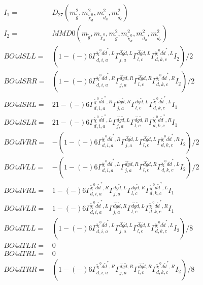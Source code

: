 \documentclass[A4,landscape]{article}
\begin{document}
\begin{align} 
I_1 = & D_{27}(m^2_{\tilde{g}}, m^2_{\tilde{\chi}^0_{{d}}}, m^2_{\tilde{d}_{{a}}}, m^2_{\tilde{d}_{{c}}}) \\ 
I_2 = & MMD0(m_{\tilde{g}}, m_{\tilde{\chi}^0_{{d}}}, m^2_{\tilde{g}}, m^2_{\tilde{\chi}^0_{{d}}}, m^2_{\tilde{d}_{{a}}}, m^2_{\tilde{d}_{{c}}}) \\ 
  BO4dSLL= & (  1
-(-)
  6 \Gamma^{\tilde{\chi}^0 d \tilde{d}^*,L}_{d, i, a} \Gamma^{\bar{d}\tilde{g} \tilde{d} ,L}_{j, a} \Gamma^{\bar{d}\tilde{g} \tilde{d} ,L}_{l, c} \Gamma^{\tilde{\chi}^0 d \tilde{d}^*,L}_{d, k, c} I_2)/2 \\ 
  BO4dSRR= & (  1
-(-)
  6 \Gamma^{\tilde{\chi}^0 d \tilde{d}^*,R}_{d, i, a} \Gamma^{\bar{d}\tilde{g} \tilde{d} ,R}_{j, a} \Gamma^{\bar{d}\tilde{g} \tilde{d} ,R}_{l, c} \Gamma^{\tilde{\chi}^0 d \tilde{d}^*,R}_{d, k, c} I_2)/2 \\ 
  BO4dSRL= & 2   1
-(-)
  6 \Gamma^{\tilde{\chi}^0 d \tilde{d}^*,R}_{d, i, a} \Gamma^{\bar{d}\tilde{g} \tilde{d} ,R}_{j, a} \Gamma^{\bar{d}\tilde{g} \tilde{d} ,L}_{l, c} \Gamma^{\tilde{\chi}^0 d \tilde{d}^*,L}_{d, k, c} I_1 \\ 
  BO4dSLR= & 2   1
-(-)
  6 \Gamma^{\tilde{\chi}^0 d \tilde{d}^*,L}_{d, i, a} \Gamma^{\bar{d}\tilde{g} \tilde{d} ,L}_{j, a} \Gamma^{\bar{d}\tilde{g} \tilde{d} ,R}_{l, c} \Gamma^{\tilde{\chi}^0 d \tilde{d}^*,R}_{d, k, c} I_1 \\ 
  BO4dVRR= & -(  1
-(-)
  6 \Gamma^{\tilde{\chi}^0 d \tilde{d}^*,R}_{d, i, a} \Gamma^{\bar{d}\tilde{g} \tilde{d} ,L}_{j, a} \Gamma^{\bar{d}\tilde{g} \tilde{d} ,L}_{l, c} \Gamma^{\tilde{\chi}^0 d \tilde{d}^*,R}_{d, k, c} I_2)/2 \\ 
  BO4dVLL= & -(  1
-(-)
  6 \Gamma^{\tilde{\chi}^0 d \tilde{d}^*,L}_{d, i, a} \Gamma^{\bar{d}\tilde{g} \tilde{d} ,R}_{j, a} \Gamma^{\bar{d}\tilde{g} \tilde{d} ,R}_{l, c} \Gamma^{\tilde{\chi}^0 d \tilde{d}^*,L}_{d, k, c} I_2)/2 \\ 
  BO4dVRL= &   1
-(-)
  6 \Gamma^{\tilde{\chi}^0 d \tilde{d}^*,R}_{d, i, a} \Gamma^{\bar{d}\tilde{g} \tilde{d} ,L}_{j, a} \Gamma^{\bar{d}\tilde{g} \tilde{d} ,R}_{l, c} \Gamma^{\tilde{\chi}^0 d \tilde{d}^*,L}_{d, k, c} I_1 \\ 
  BO4dVLR= &   1
-(-)
  6 \Gamma^{\tilde{\chi}^0 d \tilde{d}^*,L}_{d, i, a} \Gamma^{\bar{d}\tilde{g} \tilde{d} ,R}_{j, a} \Gamma^{\bar{d}\tilde{g} \tilde{d} ,L}_{l, c} \Gamma^{\tilde{\chi}^0 d \tilde{d}^*,R}_{d, k, c} I_1 \\ 
  BO4dTLL= & (  1
-(-)
  6 \Gamma^{\tilde{\chi}^0 d \tilde{d}^*,L}_{d, i, a} \Gamma^{\bar{d}\tilde{g} \tilde{d} ,L}_{j, a} \Gamma^{\bar{d}\tilde{g} \tilde{d} ,L}_{l, c} \Gamma^{\tilde{\chi}^0 d \tilde{d}^*,L}_{d, k, c} I_2)/8 \\ 
  BO4dTLR= & 0 \\ 
  BO4dTRL= & 0 \\ 
  BO4dTRR= & (  1
-(-)
  6 \Gamma^{\tilde{\chi}^0 d \tilde{d}^*,R}_{d, i, a} \Gamma^{\bar{d}\tilde{g} \tilde{d} ,R}_{j, a} \Gamma^{\bar{d}\tilde{g} \tilde{d} ,R}_{l, c} \Gamma^{\tilde{\chi}^0 d \tilde{d}^*,R}_{d, k, c} I_2)/8 \\ 
\end{align} 
\end{document}
